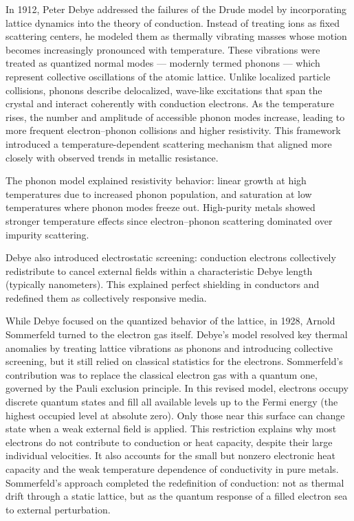 In 1912, Peter Debye addressed the failures of the Drude model by incorporating lattice dynamics into the theory of conduction. Instead of treating ions as fixed scattering centers, he modeled them as thermally vibrating masses whose motion becomes increasingly pronounced with temperature. These vibrations were treated as quantized normal modes — modernly termed phonons — which represent collective oscillations of the atomic lattice. Unlike localized particle collisions, phonons describe delocalized, wave-like excitations that span the crystal and interact coherently with conduction electrons. As the temperature rises, the number and amplitude of accessible phonon modes increase, leading to more frequent electron–phonon collisions and higher resistivity. This framework introduced a temperature-dependent scattering mechanism that aligned more closely with observed trends in metallic resistance.

The phonon model explained resistivity behavior: linear growth at high temperatures due to increased phonon population, and saturation at low temperatures where phonon modes freeze out. High-purity metals showed stronger temperature effects since electron–phonon scattering dominated over impurity scattering.

Debye also introduced electrostatic screening: conduction electrons collectively redistribute to cancel external fields within a characteristic Debye length (typically nanometers). This explained perfect shielding in conductors and redefined them as collectively responsive media.

While Debye focused on the quantized behavior of the lattice, in 1928, Arnold Sommerfeld turned to the electron gas itself. Debye's model resolved key thermal anomalies by treating lattice vibrations as phonons and introducing collective screening, but it still relied on classical statistics for the electrons. Sommerfeld's contribution was to replace the classical electron gas with a quantum one, governed by the Pauli exclusion principle. In this revised model, electrons occupy discrete quantum states and fill all available levels up to the Fermi energy (the highest occupied level at absolute zero). Only those near this surface can change state when a weak external field is applied. This restriction explains why most electrons do not contribute to conduction or heat capacity, despite their large individual velocities. It also accounts for the small but nonzero electronic heat capacity and the weak temperature dependence of conductivity in pure metals. Sommerfeld's approach completed the redefinition of conduction: not as thermal drift through a static lattice, but as the quantum response of a filled electron sea to external perturbation.

